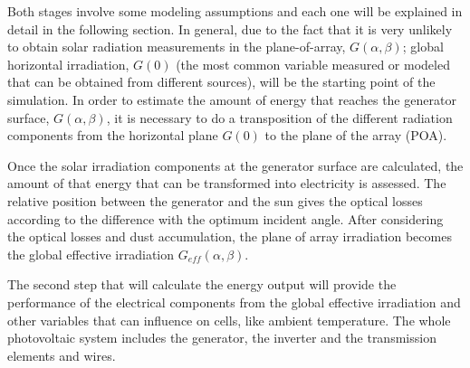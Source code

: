 Both stages involve some modeling assumptions and each one will be explained in detail in the following section. In general, due to the fact that it is very unlikely to obtain solar radiation measurements in the plane-of-array, $G(\alpha, \beta)$; global horizontal irradiation, $G(0)$ (the most common variable measured or modeled that can be obtained from different sources), will be the starting point of the simulation. In order to estimate the amount of energy that reaches the generator surface, $G(\alpha, \beta)$, it is necessary to do a transposition of the different radiation components from the horizontal plane $G(0)$ to the plane of the array (POA).


Once the solar irradiation components at the generator surface are calculated, the amount of that energy that can be transformed into electricity is assessed. The relative position between the generator and the sun gives the optical losses according to the difference with the optimum incident angle. After considering the optical losses and dust accumulation, the plane of array irradiation becomes the global effective irradiation $G_{eff}(\alpha, \beta)$.

The second step that will calculate the energy output will provide the performance of the electrical components from the global effective irradiation and other variables that can influence on cells, like ambient temperature. The whole photovoltaic system includes the generator, the inverter and the transmission elements and wires.



